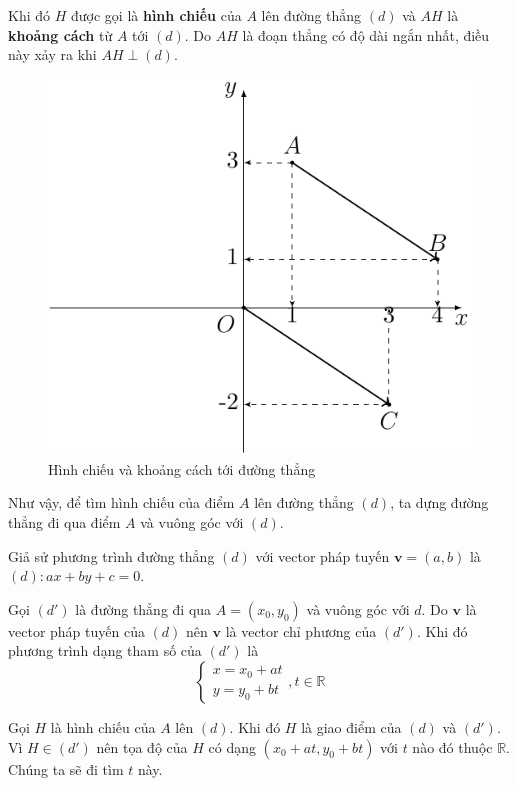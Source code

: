 Khi đó $H$ được gọi là \textbf{hình chiếu} của $A$ lên đường thẳng $(d)$ và $AH$ là \textbf{khoảng cách} từ $A$ tới $(d)$. Do $AH$ là đoạn thẳng có độ dài ngắn nhất, điều này xảy ra khi $AH \perp (d)$.

\begin{figure}[ht]
	\centering
	\includegraphics[page=2]{analytic_geometry/oxy.pdf}
	\caption{Hình chiếu và khoảng cách tới đường thẳng}
	\label{oxy2}
\end{figure}

Như vậy, để tìm hình chiếu của điểm $A$ lên đường thẳng $(d)$, ta dựng đường thẳng đi qua điểm $A$ và vuông góc với $(d)$.

Giả sử phương trình đường thẳng $(d)$ với vector pháp tuyến $\bm{v} = (a, b)$ là $(d): ax + by + c = 0$.

Gọi $(d')$ là đường thẳng đi qua $A = (x_0, y_0)$ và vuông góc với $d$. Do $\bm{v}$ là vector pháp tuyến của $(d)$ nên $\bm{v}$ là vector chỉ phương của $(d')$. Khi đó phương trình dạng tham số của $(d')$ là \[\begin{cases}
	x = x_0 + a t \\ y = y_0 + b t
\end{cases}, t \in \mathbb{R}\]

Gọi $H$ là hình chiếu của $A$ lên $(d)$. Khi đó $H$ là giao điểm của $(d)$ và $(d')$. Vì $H \in (d')$ nên tọa độ của $H$ có dạng $(x_0 + at, y_0 + bt)$ với $t$ nào đó thuộc $\mathbb{R}$. Chúng ta sẽ đi tìm $t$ này.

